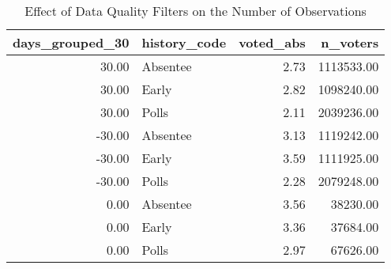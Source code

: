 \begin{table}[!htb]
\centering
\caption{Effect of Data Quality Filters on the Number of Observations} 
\label{table:tab12}
\begingroup\small
\begin{tabular}{rlrr}
  \hline
days_grouped_30 & history_code & voted_abs & n_voters \\ 
  \hline
30.00 & Absentee & 2.73 & 1113533.00 \\ 
  30.00 & Early & 2.82 & 1098240.00 \\ 
  30.00 & Polls & 2.11 & 2039236.00 \\ 
  -30.00 & Absentee & 3.13 & 1119242.00 \\ 
  -30.00 & Early & 3.59 & 1111925.00 \\ 
  -30.00 & Polls & 2.28 & 2079248.00 \\ 
  0.00 & Absentee & 3.56 & 38230.00 \\ 
  0.00 & Early & 3.36 & 37684.00 \\ 
  0.00 & Polls & 2.97 & 67626.00 \\ 
   \hline
\end{tabular}
\endgroup
\end{table}
